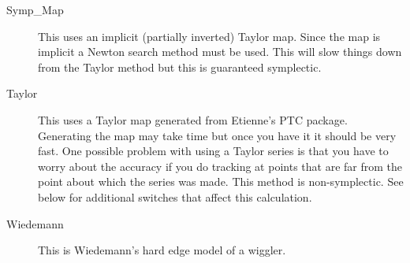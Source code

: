 \begin{description}
\item[Symp\_Map]
This uses an implicit (partially inverted) Taylor map.
Since the map is implicit a Newton search method must be used. This will slow
things down from the Taylor method but this is guaranteed symplectic.

\item[Taylor]
This uses a Taylor map generated from Etienne's PTC package. Generating
the map may take time but once you have it it should be very fast. One
possible problem with using a Taylor series is that you have to worry about
the accuracy if you do tracking at points that are far from the point about
which the series was made. This method is non-symplectic. See below for
additional switches that affect this calculation.

\item[Wiedemann]
This is Wiedemann's hard edge model of a wiggler.

\end{description}

\vfill \break

